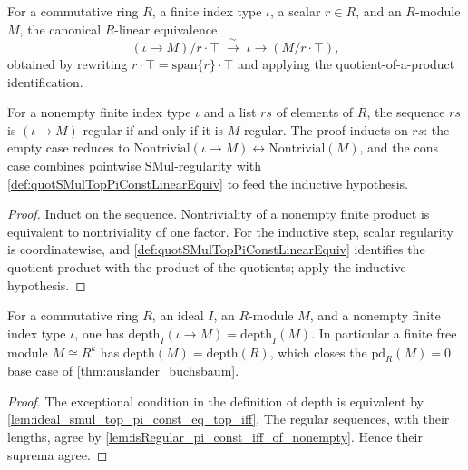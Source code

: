 \begin{definition}\leanok
  \label{def:quotSMulTopPiConstLinearEquiv}
  For a commutative ring \(R\), a finite index type \(\iota\), a scalar \(r \in R\), and
  an \(R\)-module \(M\), the canonical \(R\)-linear equivalence
  \[
    (\iota \to M)\big/ r \cdot \top \;\xrightarrow{\ \sim\ }\; \iota \to (M / r \cdot \top),
  \]
  obtained by rewriting \(r \cdot \top = \text{span}\{r\} \cdot \top\) and applying the
  quotient-of-a-product identification.
\end{definition}

\begin{lemma}\leanok
  \label{lem:isRegular_pi_const_iff_of_nonempty}
  For a nonempty finite index type \(\iota\) and a list \(rs\) of elements of \(R\), the
  sequence \(rs\) is \((\iota \to M)\)-regular if and only if it is \(M\)-regular. The
  proof inducts on \(rs\): the empty case reduces to
  \(\text{Nontrivial}(\iota \to M) \leftrightarrow \text{Nontrivial}(M)\), and the cons
  case combines pointwise \(\text{SMul}\)-regularity with
  \cref{def:quotSMulTopPiConstLinearEquiv} to feed the inductive hypothesis.
\end{lemma}
\begin{proof}

\leanok
  Induct on the sequence. Nontriviality of a nonempty finite product
  is equivalent to nontriviality of one factor. For the inductive step,
  scalar regularity is coordinatewise, and
  \cref{def:quotSMulTopPiConstLinearEquiv} identifies the quotient product
  with the product of the quotients; apply the inductive hypothesis.
\end{proof}

\begin{lemma}\leanok
  \label{lem:depth_pi_const_eq_depth_of_nonempty}
  For a commutative ring \(R\), an ideal \(I\), an \(R\)-module \(M\), and a nonempty
  finite index type \(\iota\), one has \(\text{depth}_I(\iota \to M) = \text{depth}_I(M)\).
  In particular a finite free module \(M \cong R^k\) has \(\text{depth}(M) = \text{depth}(R)\),
  which closes the \(\text{pd}_R(M) = 0\) base case of \cref{thm:auslander_buchsbaum}.
\end{lemma}
\begin{proof}

\leanok
  The exceptional condition in the definition of depth is equivalent
  by \cref{lem:ideal_smul_top_pi_const_eq_top_iff}. The regular sequences,
  with their lengths, agree by
  \cref{lem:isRegular_pi_const_iff_of_nonempty}. Hence their suprema agree.
\end{proof}

